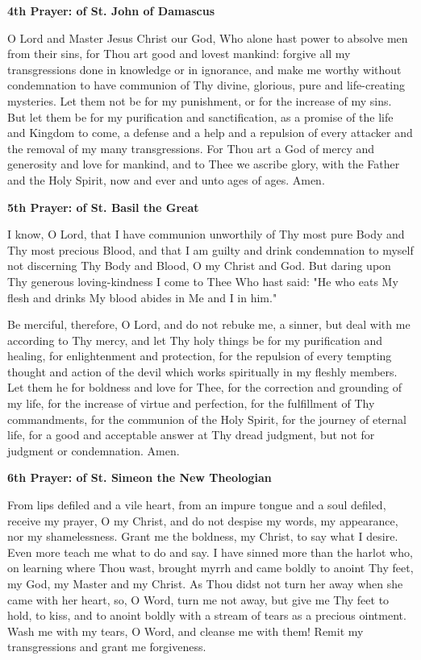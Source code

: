 \begin{center}
	\textbf{4th Prayer: of St. John of Damascus}
\end{center}

O Lord and Master Jesus Christ our God, Who alone hast power to absolve men from their sins, for Thou art good and lovest mankind: forgive all my transgressions done in knowledge or in ignorance, and make me worthy without condemnation to have communion of Thy divine, glorious, pure and life-creating mysteries. Let them not be for my punishment, or for the increase of my sins. But let them be for my purification and sanctification, as a promise of the life and Kingdom to come, a defense and a help and a repulsion of every attacker and the removal of my many transgressions. For Thou art a God of mercy and generosity and love for mankind, and to Thee we ascribe glory, with the Father and the Holy Spirit, now and ever and unto ages of ages. Amen.  

\begin{center}
	\textbf{5th Prayer: of St. Basil the Great}
\end{center}

I know, O Lord, that I have communion unworthily of Thy most pure Body and Thy most precious Blood, and that I am guilty and drink condemnation to myself not discerning Thy Body and Blood, O my Christ and God. But daring upon Thy generous loving-kindness I come to Thee Who hast said: "He who eats My flesh and drinks My blood abides in Me and I in him." 

Be merciful, therefore, O Lord, and do not rebuke me, a sinner, but deal with me according to Thy mercy, and let Thy holy things be for my purification and healing, for enlightenment and protection, for the repulsion of every tempting thought and action of the devil which works spiritually in my fleshly members. Let them he for boldness and love for Thee, for the correction and grounding of my life, for the increase of virtue and perfection, for the fulfillment of Thy commandments, for the communion of the Holy Spirit, for the journey of eternal life, for a good and acceptable answer at Thy dread judgment, but not for judgment or condemnation. Amen. 

\begin{center}
	\textbf{6th Prayer: of St. Simeon the New Theologian}
\end{center}

From lips defiled and a vile heart, from an impure tongue and a soul defiled, receive my prayer, O my Christ, and do not despise my words, my appearance, nor my shamelessness. Grant me the boldness, my Christ, to say what I desire. Even more teach me what to do and say. I have sinned more than the harlot who, on learning where Thou wast, brought myrrh and came boldly to anoint Thy feet, my God, my Master and my Christ. As Thou didst not turn her away when she came with her heart, so, O Word, turn me not away, but give me Thy feet to hold, to kiss, and to anoint boldly with a stream of tears as a precious ointment. Wash me with my tears, O Word, and cleanse me with them! Remit my transgressions and grant me forgiveness.

